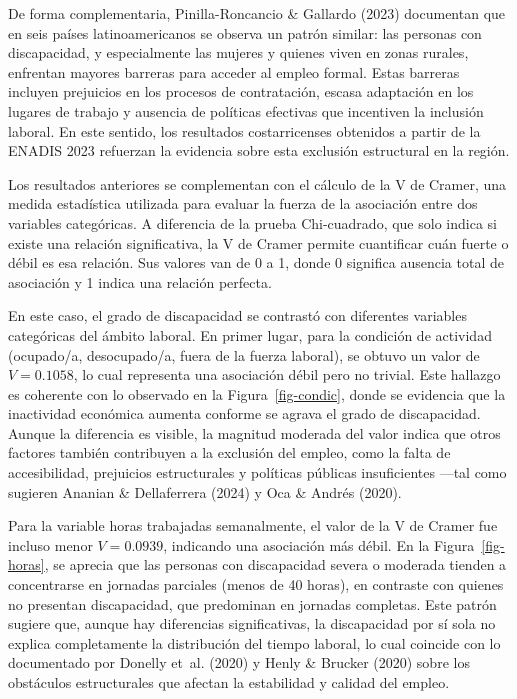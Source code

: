 \documentclass[
  11pt,
  oneside]{article}
\begin{document}
De forma complementaria, Pinilla-Roncancio \& Gallardo (2023) documentan
que en seis países latinoamericanos se observa un patrón similar: las
personas con discapacidad, y especialmente las mujeres y quienes viven
en zonas rurales, enfrentan mayores barreras para acceder al empleo
formal. Estas barreras incluyen prejuicios en los procesos de
contratación, escasa adaptación en los lugares de trabajo y ausencia de
políticas efectivas que incentiven la inclusión laboral. En este
sentido, los resultados costarricenses obtenidos a partir de la ENADIS
2023 refuerzan la evidencia sobre esta exclusión estructural en la
región.

Los resultados anteriores se complementan con el cálculo de la V de
Cramer, una medida estadística utilizada para evaluar la fuerza de la
asociación entre dos variables categóricas. A diferencia de la prueba
Chi-cuadrado, que solo indica si existe una relación significativa, la V
de Cramer permite cuantificar cuán fuerte o débil es esa relación. Sus
valores van de 0 a 1, donde 0 significa ausencia total de asociación y 1
indica una relación perfecta.

En este caso, el grado de discapacidad se contrastó con diferentes
variables categóricas del ámbito laboral. En primer lugar, para la
condición de actividad (ocupado/a, desocupado/a, fuera de la fuerza
laboral), se obtuvo un valor de \(V = 0.1058\), lo cual representa una
asociación débil pero no trivial. Este hallazgo es coherente con lo
observado en la Figura~\ref{fig-condic}, donde se evidencia que la
inactividad económica aumenta conforme se agrava el grado de
discapacidad. Aunque la diferencia es visible, la magnitud moderada del
valor indica que otros factores también contribuyen a la exclusión del
empleo, como la falta de accesibilidad, prejuicios estructurales y
políticas públicas insuficientes ---tal como sugieren Ananian \&
Dellaferrera (2024) y Oca \& Andrés (2020).

Para la variable horas trabajadas semanalmente, el valor de la V de
Cramer fue incluso menor \(V = 0.0939\), indicando una asociación más
débil. En la Figura~\ref{fig-horas}, se aprecia que las personas con
discapacidad severa o moderada tienden a concentrarse en jornadas
parciales (menos de 40 horas), en contraste con quienes no presentan
discapacidad, que predominan en jornadas completas. Este patrón sugiere
que, aunque hay diferencias significativas, la discapacidad por sí sola
no explica completamente la distribución del tiempo laboral, lo cual
coincide con lo documentado por Donelly et~al. (2020) y Henly \& Brucker
(2020) sobre los obstáculos estructurales que afectan la estabilidad y
calidad del empleo.
\end{document}
